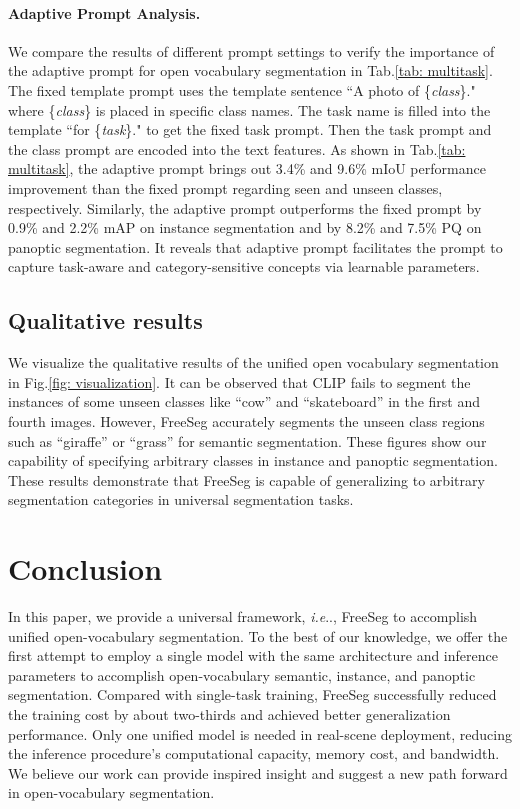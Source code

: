 \documentclass[10pt,twocolumn,letterpaper]{article}
\makeatletter
\DeclareRobustCommand\onedot{\futurelet\@let@token\@onedot}
\def\@onedot{\ifx\@let@token.\else.\null\fi\xspace}
\def\ie{\emph{i.e}\onedot} \def\Ie{\emph{I.e}\onedot}
\makeatother
\begin{document}
\paragraph{Adaptive Prompt Analysis.}
We compare the results of different prompt settings to verify the importance of the adaptive prompt for open vocabulary segmentation in Tab.\ref{tab: multitask}. 
The fixed template prompt uses the template sentence ``A photo of \{\textit{class}\}." where \{\textit{class}\} is placed in specific class names. The task name is filled into the template ``for \{\textit{task}\}." to get the fixed task prompt. Then the task prompt and the class prompt are encoded into the text features.
As shown in Tab.\ref{tab: multitask}, the adaptive prompt brings out 3.4\% and 9.6\% mIoU performance improvement than the fixed prompt regarding seen and unseen classes, respectively. 
Similarly, the adaptive prompt outperforms the fixed prompt by 0.9\% and 2.2\% mAP on instance segmentation and by 8.2\% and 7.5\% PQ on panoptic segmentation. 
It reveals that adaptive prompt facilitates the prompt to capture task-aware and category-sensitive concepts via learnable parameters.


\subsection{Qualitative results}
We visualize the qualitative results of the unified open vocabulary segmentation in Fig.\ref{fig: visualization}. It can be observed that CLIP fails to segment the instances of some unseen classes like ``cow'' and ``skateboard'' in the first and fourth images. However, FreeSeg accurately segments the unseen class regions such as ``giraffe'' or ``grass'' for semantic segmentation.
These figures show our capability of specifying arbitrary classes in instance and panoptic segmentation.
These results demonstrate that FreeSeg is capable of generalizing to arbitrary segmentation categories in universal segmentation tasks.


\section{Conclusion}
In this paper, we provide a universal framework, \ie, FreeSeg to accomplish unified open-vocabulary segmentation.
To the best of our knowledge, we offer the first attempt to employ a single model with the same architecture and inference parameters to accomplish open-vocabulary semantic, instance, and panoptic segmentation.
Compared with single-task training, FreeSeg successfully reduced the training cost by about two-thirds and achieved better generalization performance.  Only one unified model is needed in real-scene deployment, reducing the inference procedure's computational capacity, memory cost, and bandwidth. 
We believe our work can provide inspired insight and suggest a new path forward in open-vocabulary segmentation.




{\small


}
\end{document}
